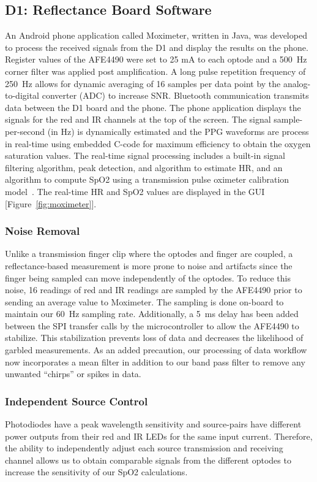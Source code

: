     \subsection{D1: Reflectance Board Software}
    An Android phone application called Moximeter, written in Java, was developed to process the received signals from the D1 and display the results on the phone. Register values of the AFE4490 were set to 25 mA to each optode and a 500~Hz corner filter was applied post amplification. A long pulse repetition frequency of 250~Hz allows for dynamic averaging of 16 samples per data point by the analog-to-digital converter (ADC) to increase SNR. Bluetooth communication transmits data between the D1 board and the phone. The phone application displays the signals for the red and IR channels at the top of the screen. The signal sample-per-second (in Hz) is dynamically estimated and the PPG waveforms are process in real-time using embedded C-code for maximum efficiency to obtain the oxygen saturation values. The real-time signal processing includes a built-in signal filtering algorithm, peak detection, and algorithm to estimate HR, and an algorithm to compute SpO2 using a transmission pulse oximeter calibration model~\cite{Bailey2008}. The real-time HR and SpO2 values are displayed in the GUI [Figure~\ref{fig:moximeter}]. 
    
        \subsubsection{Noise Removal}
        Unlike a transmission finger clip where the optodes and finger are coupled, a reflectance-based measurement is more prone to noise and artifacts since the finger being sampled can move independently of the optodes. To reduce this noise, 16 readings of red and IR readings are sampled by the AFE4490 prior to sending an average value to Moximeter. The sampling is done on-board to maintain our 60~Hz sampling rate. Additionally, a 5~ms delay has been added between the SPI transfer calls by the microcontroller to allow the AFE4490 to stabilize. This stabilization prevents loss of data and decreases the likelihood of garbled measurements. As an added precaution, our processing of data workflow now incorporates a mean filter in addition to our band pass filter to remove any unwanted ``chirps'' or spikes in data. 
        
        \subsubsection{Independent Source Control}
        Photodiodes have a peak wavelength sensitivity and source-pairs have different power outputs from their red and IR LEDs for the same input current. Therefore, the ability to independently adjust each source transmission and receiving channel allows us to obtain comparable signals from the different optodes to increase the sensitivity of our SpO2 calculations.

